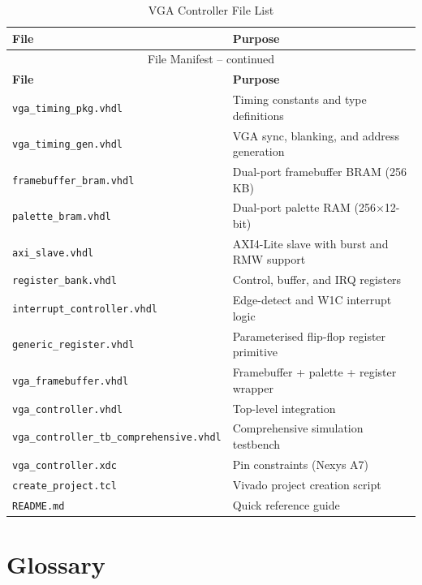 \documentclass[11pt,letterpaper]{report}
\begin{document}
\begin{longtable}{ll}
\caption{VGA Controller File List}
\label{tab:file_list} \\
\toprule
\textbf{File} & \textbf{Purpose} \\
\midrule
\endfirsthead

\multicolumn{2}{c}{File Manifest -- continued} \\
\toprule
\textbf{File} & \textbf{Purpose} \\
\midrule
\endhead

\bottomrule
\endfoot

\bottomrule
\endlastfoot

\texttt{vga\_timing\_pkg.vhdl} & Timing constants and type definitions \\
\texttt{vga\_timing\_gen.vhdl} & VGA sync, blanking, and address generation \\
\texttt{framebuffer\_bram.vhdl} & Dual-port framebuffer BRAM (256 KB) \\
\texttt{palette\_bram.vhdl} & Dual-port palette RAM (256$\times$12-bit) \\
\texttt{axi\_slave.vhdl} & AXI4-Lite slave with burst and RMW support \\
\texttt{register\_bank.vhdl} & Control, buffer, and IRQ registers \\
\texttt{interrupt\_controller.vhdl} & Edge-detect and W1C interrupt logic \\
\texttt{generic\_register.vhdl} & Parameterised flip-flop register primitive \\
\texttt{vga\_framebuffer.vhdl} & Framebuffer + palette + register wrapper \\
\texttt{vga\_controller.vhdl} & Top-level integration \\
\texttt{vga\_controller\_tb\_comprehensive.vhdl} & Comprehensive simulation testbench \\
\texttt{vga\_controller.xdc} & Pin constraints (Nexys A7) \\
\texttt{create\_project.tcl} & Vivado project creation script \\
\texttt{README.md} & Quick reference guide \\
\end{longtable}

\section{Glossary}
\end{document}
